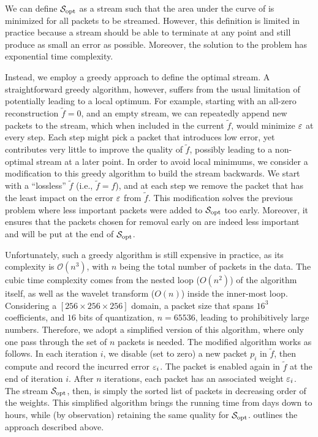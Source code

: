 We can define $\sopt$ as a stream such that the area under the curve of \err is minimized for all
packets to be streamed. However, this definition is limited in practice because a stream should be
able to terminate at any point and still produce as small an error as possible. Moreover, the
solution to the problem has exponential time complexity.

Instead, we employ a greedy approach to define the optimal stream.  A straightforward greedy
algorithm, however, suffers from the usual limitation of potentially leading to a local optimum. For
example, starting with an all-zero reconstruction $\tilde{f}=0$, and an empty stream, we can
repeatedly append new packets to the stream, which when included in the current $\tilde{f}$, would
minimize $\err$ at every step. Each step might pick a packet that introduces low error, yet
contributes very little to improve the quality of $\tilde{f}$, possibly leading to a non-optimal
stream at a later point. In order to avoid local minimums, we consider a modification to this greedy
algorithm to build the stream backwards. We start with a ``lossless'' $\tilde{f}$ (i.e.,
$\tilde{f}=f$), and at each step we remove the packet that has the least impact on the error $\err$
from $\tilde{f}$. This modification solves the previous problem where less important packets were
added to $\sopt$ too early. Moreover, it ensures that the packets chosen for removal early on are
indeed less important and will be put at the end of $\sopt$.

Unfortunately, such a greedy algorithm is still expensive in practice, as its complexity is
$\mathcal{O}(n^3)$, with $n$ being the total number of packets in the data. The cubic time
complexity comes from the nested loop ($O(n^2)$) of the algorithm itself, as well as the wavelet
transform ($O(n)$) inside the inner-most loop. Considering a $[256 \times 256 \times 256]$ domain, a
packet size that spans $16^3$ coefficients, and $16$ bits of quantization, $n = 65536$, leading to
prohibitively large numbers. Therefore, we adopt a simplified version of this algorithm, where only
one pass through the set of $n$ packets is needed. The modified algorithm works as follows. In each
iteration $i$, we disable (set to zero) a new packet $p_i$ in $\tilde{f}$, then compute and record
the incurred error $\err_i$. The packet is enabled again in $\tilde{f}$ at the end of iteration $i$.
After $n$ iterations, each packet has an associated weight $\err_i$.  The stream $\sopt$, then, is
simply the sorted list of packets in decreasing order of the weights. This simplified algorithm
brings the running time from days down to hours, while (by observation) retaining the same quality
for $\sopt$.  outlines the approach described above.

